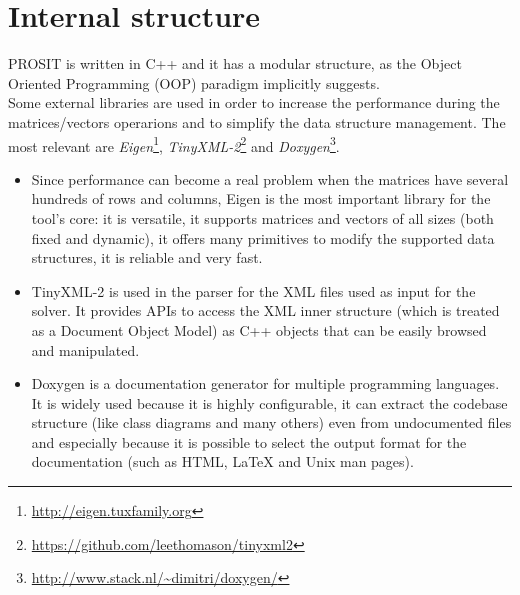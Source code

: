 \section{Internal structure}\label{structure}
PROSIT is written in C++ and it has a modular structure, as the Object Oriented Programming (OOP) paradigm implicitly suggests.\\
Some external libraries are used in order to increase the performance during the matrices/vectors operarions and to simplify the data structure management. The most relevant are \emph{Eigen}\footnote{\url{http://eigen.tuxfamily.org}}, \emph{TinyXML-2}\footnote{\url{https://github.com/leethomason/tinyxml2}} and \emph{Doxygen}\footnote{\url{http://www.stack.nl/~dimitri/doxygen/}}.
\begin{itemize}
  \item Since performance can become a real problem when the matrices have several hundreds of rows and columns, Eigen is the most important library for the tool's core: it is versatile, it supports matrices and vectors of all sizes (both fixed and dynamic), it offers many primitives to modify the supported data structures, it is reliable and very fast.
  \item TinyXML-2 is used in the parser for the XML files used as input for the solver. It provides APIs to access the XML inner structure (which is treated as a Document Object Model) as C++ objects that can be easily browsed and manipulated.
  \item Doxygen is a documentation generator for multiple programming languages. It is widely used because it is highly configurable, it can extract the codebase structure (like class diagrams and many others) even from undocumented files and especially because it is possible to select the output format for the documentation (such as HTML, {\LaTeX} and Unix man pages).
\end{itemize}

